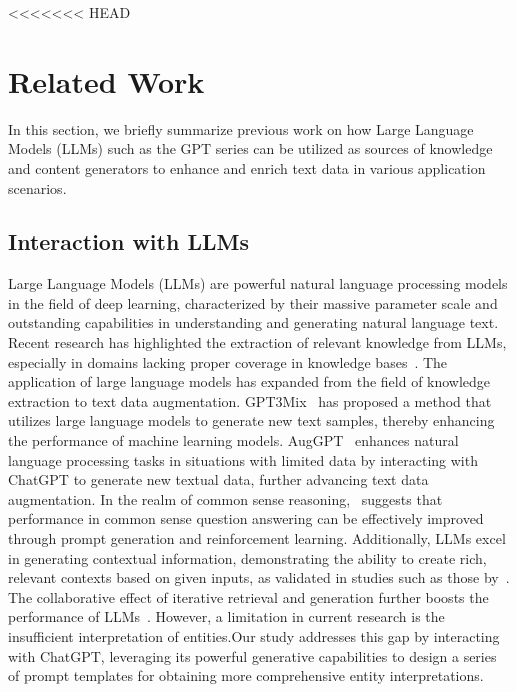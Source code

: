 <<<<<<< HEAD

\section{Related Work}
\label{sec:related}
In this section, we briefly summarize previous work on how Large Language Models (LLMs) such as the GPT series can be utilized as sources of knowledge and content generators to enhance and enrich text data in various application scenarios.
\subsection{Interaction with LLMs}
Large Language Models (LLMs) are powerful natural language processing models in the field of deep learning, 
characterized by their massive parameter scale and outstanding capabilities in understanding and generating natural language text. 
Recent research has highlighted the extraction of relevant knowledge from LLMs, especially in domains lacking proper coverage in knowledge bases~\citep{fang2021leveraging}. 
The application of large language models has expanded from the field of knowledge extraction to text data augmentation. 
GPT3Mix~\citep{yoo2021gpt3mix} has proposed a method that utilizes large language models to generate new text samples, thereby enhancing the performance of machine learning models.
AugGPT~\citep{dai2023auggpt} enhances natural language processing tasks in situations with limited data by interacting with ChatGPT to generate new textual data, further advancing text data augmentation.
In the realm of common sense reasoning,~\citep{liu2021generated,liu2022rainier} suggests that performance in common sense question answering can be effectively improved through prompt generation and reinforcement learning. 
Additionally, LLMs excel in generating contextual information, demonstrating the ability to create rich, 
relevant contexts based on given inputs, as validated in studies such as those by~\citep{yu2022generate}. 
The collaborative effect of iterative retrieval and generation further boosts the performance of LLMs~\citep{shao2023enhancing}. 
However, a limitation in current research is the insufficient interpretation of entities.Our study addresses this gap by interacting with ChatGPT, 
leveraging its powerful generative capabilities to design a series of prompt templates for obtaining more comprehensive entity interpretations.



